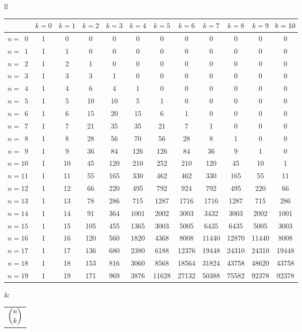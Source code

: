 \hspace{-6pt}\begin{tabular}{ll}
\begin{tabular}[t]{l|ccccccccccc}
\toprule
& $k=0$ & $k=1$ & $k=2$ & $k=3$ & $k=4$ & $k=5$ & $k=6$ & $k=7$ & $k=8$ & $k=9$ & $\hspace{-2pt}k=10\hspace{-2pt}$\\
\midrule%
$n=\phantom{1}0$ & 1 & 0 & 0 & 0 & 0 & 0 & 0 & 0 & 0 & 0 & 0\\
$n=\phantom{1}1$ & 1 & 1 & 0 & 0 & 0 & 0 & 0 & 0 & 0 & 0 & 0\\
$n=\phantom{1}2$ & 1 & 2 & 1 & 0 & 0 & 0 & 0 & 0 & 0 & 0 & 0\\
$n=\phantom{1}3$ & 1 & 3 & 3 & 1 & 0 & 0 & 0 & 0 & 0 & 0 & 0\\
\midrule%
$n=\phantom{1}4$ & 1 & 4 & 6 & 4 & 1 & 0 & 0 & 0 & 0 & 0 & 0\\
$n=\phantom{1}5$ & 1 & 5 & 10 & 10 & 5 & 1 & 0 & 0 & 0 & 0 & 0\\
$n=\phantom{1}6$ & 1 & 6 & 15 & 20 & 15 & 6 & 1 & 0 & 0 & 0 & 0\\
$n=\phantom{1}7$ & 1 & 7 & 21 & 35 & 35 & 21 & 7 & 1 & 0 & 0 & 0\\
\midrule%
$n=\phantom{1}8$ & 1 & 8 & 28 & 56 & 70 & 56 & 28 & 8 & 1 & 0 & 0\\
$n=\phantom{1}9$ & 1 & 9 & 36 & 84 & 126 & 126 & 84 & 36 & 9 & 1 & 0\\
$n=10$ & 1 & 10 & 45 & 120 & 210 & 252 & 210 & 120 & 45 & 10 & 1\\
$n=11$ & 1 & 11 & 55 & 165 & 330 & 462 & 462 & 330 & 165 & 55 & 11\\
\midrule%
$n=12$ & 1 & 12 & 66 & 220 & 495 & 792 & 924 & 792 & 495 & 220 & 66\\
$n=13$ & 1 & 13 & 78 & 286 & 715 & 1287 & 1716 & 1716 & 1287 & 715 & 286\\
$n=14$ & 1 & 14 & 91 & 364 & 1001 & 2002 & 3003 & 3432 & 3003 & 2002 & 1001\\
$n=15$ & 1 & 15 & 105 & 455 & 1365 & 3003 & 5005 & 6435 & 6435 & 5005 & 3003\\
\midrule%
$n=16$ & 1 & 16 & 120 & 560 & 1820 & 4368 & 8008 & 11440 & 12870 & 11440 & 8008\\
$n=17$ & 1 & 17 & 136 & 680 & 2380 & 6188 & 12376 & 19448 & 24310 & 24310 & 19448\\
$n=18$ & 1 & 18 & 153 & 816 & 3060 & 8568 & 18564 & 31824 & 43758 & 48620 & 43758\\
$n=19$ & 1 & 19 & 171 & 969 & 3876 & 11628 & 27132 & 50388 & 75582 & 92378 & 92378\\
\bottomrule
\end{tabular}
& \begin{tabular}[t]{l}
\\
$\dbinom{n}{k}$
\end{tabular}
\end{tabular}

